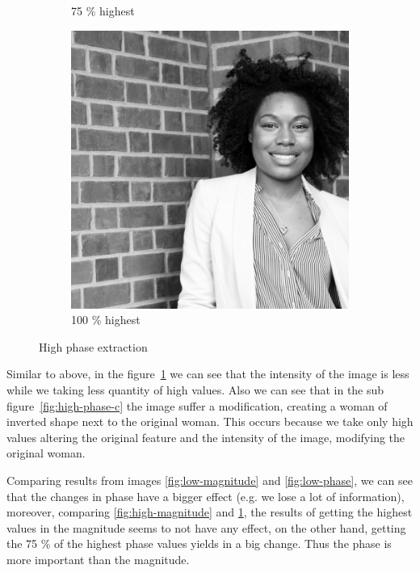 \begin{figure}[h!]
\begin{subfigure}{0.2\textwidth}
  \caption{75 \% highest}
\end{subfigure}%
\begin{subfigure}{0.2\textwidth}
  \centering
  \includegraphics[width=0.95\linewidth]{output/phase_high_100.jpg}
  \caption{100 \% highest}
\end{subfigure}%
 \caption{High phase extraction}
\label{fig:high-phase}
\end{figure}
Similar to above, in the figure~\ref{fig:high-phase} we can see that the intensity of the image is less while we taking less quantity of high values. Also we can see that in the sub figure~\ref{fig:high-phase-c} the image suffer a modification, creating a woman of inverted shape next to the original woman. This occurs because we take only high values altering the original feature and the intensity of the image, modifying the original woman.

Comparing results from images \ref{fig:low-magnitude} and \ref{fig:low-phase}, we can see that the changes in phase have a bigger effect (e.g. we lose a lot of information), moreover, comparing \ref{fig:high-magnitude} and \ref{fig:high-phase}, the results of getting the highest values in the magnitude seems to not have any effect, on the other hand, getting the 75 \% of the highest phase values yields in a big change. Thus the phase is more important than the magnitude.

